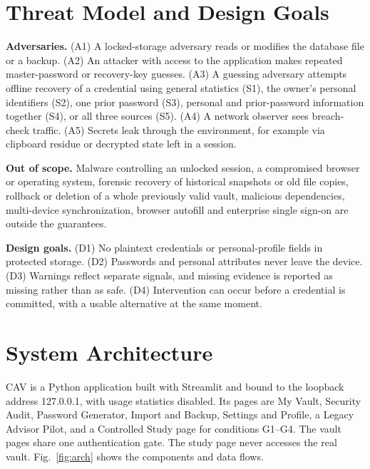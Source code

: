 \documentclass[conference]{IEEEtran}
\begin{document}
\section{Threat Model and Design Goals}
\textbf{Adversaries.} (A1) A locked-storage adversary reads or modifies the database file or a backup. (A2) An attacker with access to the application makes repeated master-password or recovery-key guesses. (A3) A guessing adversary attempts offline recovery of a credential using general statistics (S1), the owner's personal identifiers (S2), one prior password (S3), personal and prior-password information together (S4), or all three sources (S5). (A4) A network observer sees breach-check traffic. (A5) Secrets leak through the environment, for example via clipboard residue or decrypted state left in a session.

\textbf{Out of scope.} Malware controlling an unlocked session, a compromised browser or operating system, forensic recovery of historical snapshots or old file copies, rollback or deletion of a whole previously valid vault, malicious dependencies, multi-device synchronization, browser autofill and enterprise single sign-on are outside the guarantees.

\textbf{Design goals.} (D1) No plaintext credentials or personal-profile fields in protected storage. (D2) Passwords and personal attributes never leave the device. (D3) Warnings reflect separate signals, and missing evidence is reported as missing rather than as safe. (D4) Intervention can occur before a credential is committed, with a usable alternative at the same moment.

\section{System Architecture}
CAV is a Python application built with Streamlit and bound to the loopback address 127.0.0.1, with usage statistics disabled. Its pages are My Vault, Security Audit, Password Generator, Import and Backup, Settings and Profile, a Legacy Advisor Pilot, and a Controlled Study page for conditions G1--G4. The vault pages share one authentication gate. The study page never accesses the real vault. Fig.~\ref{fig:arch} shows the components and data flows.
\end{document}
